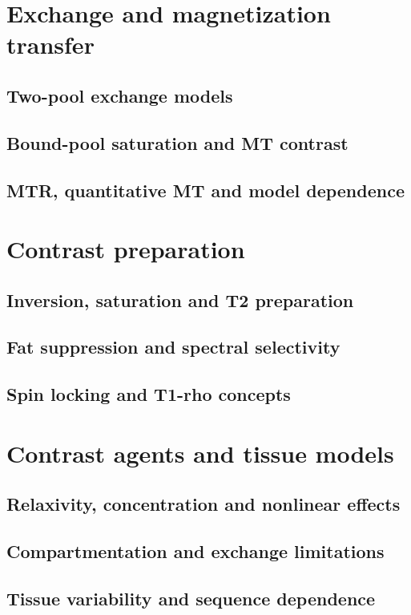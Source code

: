 \section{Exchange and magnetization transfer}
\label{sec:09:exchange-and-magnetization-transfer}
\subsection{Two-pool exchange models}
\subsection{Bound-pool saturation and MT contrast}
\subsection{MTR, quantitative MT and model dependence}

\section{Contrast preparation}
\label{sec:09:contrast-preparation}
\subsection{Inversion, saturation and T2 preparation}
\subsection{Fat suppression and spectral selectivity}
\subsection{Spin locking and T1-rho concepts}

\section{Contrast agents and tissue models}
\label{sec:09:contrast-agents-and-tissue-models}
\subsection{Relaxivity, concentration and nonlinear effects}
\subsection{Compartmentation and exchange limitations}
\subsection{Tissue variability and sequence dependence}

